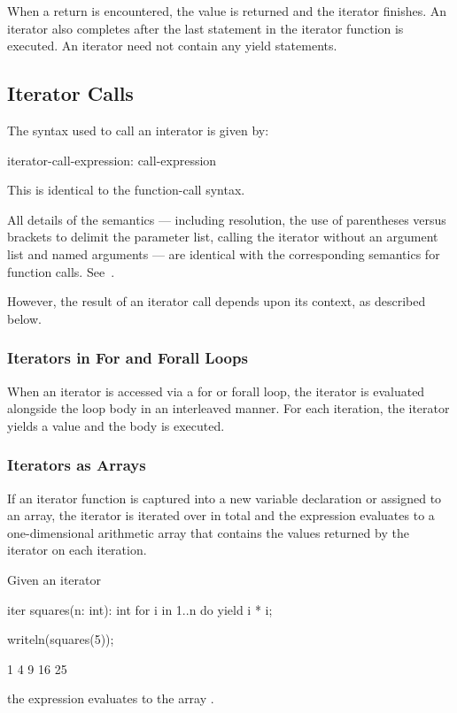 When a return is encountered, the value is returned and
the iterator finishes.  An iterator also completes after the last
statement in the iterator function is executed.
An iterator need not contain any yield statements.


\subsection{Iterator Calls}
\label{Iterator_Calls}

The syntax used to call an interator is given by:
\begin{syntax}
iterator-call-expression:
  call-expression
\end{syntax}
This is identical to the function-call syntax.

All details of the  semantics --- including
resolution, the use of parentheses versus brackets to delimit the parameter
list, calling the iterator without an argument list and named arguments ---
are identical with the corresponding semantics for function calls.
See~.

However, the result of an iterator call depends upon its context, as described below.

\subsubsection{Iterators in For and Forall Loops}
\label{Iterators_in_For_and_Forall_Loops}

When an iterator is accessed via a for or forall loop, the iterator is
evaluated alongside the loop body in an interleaved manner.  For each
iteration, the iterator yields a value and the body is executed.

\subsubsection{Iterators as Arrays}
\label{Iterators_as_Arrays}

If an iterator function is captured into a new variable declaration or
assigned to an array, the iterator is iterated over in total and the
expression evaluates to a one-dimensional arithmetic array that
contains the values returned by the iterator on each iteration.
\begin{example}
Given an iterator
\begin{chapel}
iter squares(n: int): int {
  for i in 1..n do
    yield i * i;
}
\end{chapel}
\begin{chapelpost}
writeln(squares(5));
\end{chapelpost}
\begin{chapeloutput}
1 4 9 16 25
\end{chapeloutput}
the expression  evaluates to the array .
\end{example}

